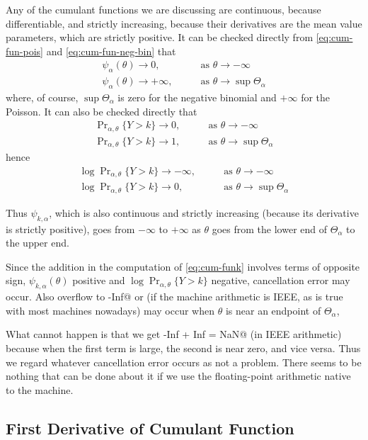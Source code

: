 \documentclass[11pt]{article}
\newcommand{\Prsub}[1]{\Pr\nolimits_{#1}}
\begin{document}
Any of the cumulant functions we are discussing are
continuous, because differentiable, and strictly increasing,
because their derivatives are the mean value parameters, which are strictly
positive.  It can be checked directly from \eqref{eq:cum-fun-pois}
and \eqref{eq:cum-fun-neg-bin} that
\begin{align*}
   \psi_\alpha(\theta) \to 0, & \qquad \text{as $\theta \to - \infty$}
   \\
   \psi_\alpha(\theta) \to + \infty,
   & \qquad \text{as $\theta \to \sup \Theta_\alpha$}
\end{align*}
where, of course, $\sup \Theta_\alpha$ is zero for the negative binomial
and $+ \infty$ for the Poisson.
It can also be checked directly that
\begin{align*}
   \Prsub{\alpha, \theta}\{Y > k\} \to 0,
   & \qquad \text{as $\theta \to - \infty$}
   \\
   \Prsub{\alpha, \theta}\{Y > k\} \to 1,
   & \qquad \text{as $\theta \to \sup \Theta_\alpha$}
\end{align*}
hence
\begin{align*}
   \log \Prsub{\alpha, \theta}\{Y > k\} \to - \infty,
   & \qquad \text{as $\theta \to - \infty$}
   \\
   \log \Prsub{\alpha, \theta}\{Y > k\} \to 0,
   & \qquad \text{as $\theta \to \sup \Theta_\alpha$}
\end{align*}

Thus $\psi_{k, \alpha}$, which is also continuous and strictly increasing
(because its derivative is strictly positive), goes from $- \infty$
to $+ \infty$
as $\theta$ goes from the lower end of $\Theta_\alpha$ to the upper end.

Since the addition in the computation of \eqref{eq:cum-funk} involves
terms of opposite sign, $\psi_{k, \alpha}(\theta)$ positive and
$\log \Prsub{\alpha, \theta}\{Y > k\}$ negative, cancellation error may occur.
Also overflow to \verb@-Inf@ or \verb@Inf@
(if the machine arithmetic is IEEE, as is true with most machines nowadays)
may occur when $\theta$ is near an endpoint of $\Theta_\alpha$,

What cannot happen is that we get \verb@-Inf + Inf = NaN@ (in IEEE arithmetic)
because when the first term is large, the second is near zero, and vice versa.
Thus we regard whatever cancellation error occurs as not a problem.
There seems to be nothing that can be done about it if we use the
floating-point arithmetic native to the machine.

\subsection{First Derivative of Cumulant Function}
\end{document}

